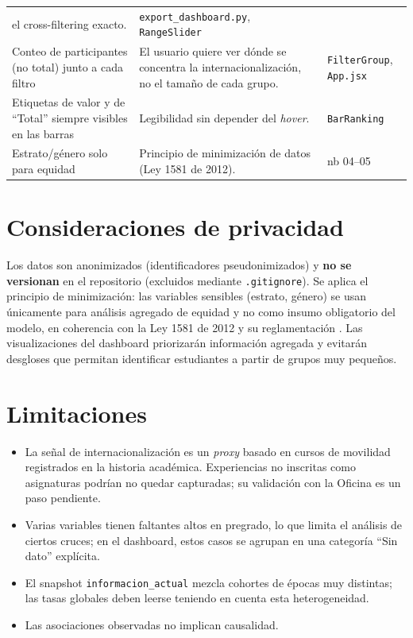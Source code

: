 \documentclass[12pt,a4paper]{article}
\begin{document}
\begin{longtable}{>{\raggedright\arraybackslash}p{4.3cm}
                  >{\raggedright\arraybackslash}p{7.3cm}
                  >{\raggedright\arraybackslash}p{2.8cm}}
el cross-filtering exacto. & \texttt{export\_dashboard.py}, \texttt{RangeSlider} \\
Conteo de participantes (no total) junto a cada filtro &
El usuario quiere ver dónde se concentra la internacionalización, no el tamaño de
cada grupo. & \texttt{FilterGroup}, \texttt{App.jsx} \\
Etiquetas de valor y de ``Total'' siempre visibles en las barras &
Legibilidad sin depender del \emph{hover}. & \texttt{BarRanking} \\
Estrato/género solo para equidad &
Principio de minimización de datos (Ley 1581 de 2012). & nb 04--05 \\
\bottomrule
\end{longtable}

\section{Consideraciones de privacidad}
Los datos son anonimizados (identificadores pseudonimizados) y \textbf{no se
versionan} en el repositorio (excluidos mediante \texttt{.gitignore}). Se aplica
el principio de minimización: las variables sensibles (estrato, género) se usan
únicamente para análisis agregado de equidad y no como insumo obligatorio del
modelo, en coherencia con la Ley 1581 de 2012 y su reglamentación
\cite{ley1581,decreto1377}. Las visualizaciones del dashboard priorizarán
información agregada y evitarán desgloses que permitan identificar estudiantes a
partir de grupos muy pequeños.

\section{Limitaciones}
\begin{itemize}[leftmargin=*]
    \item La señal de internacionalización es un \emph{proxy} basado en cursos de
    movilidad registrados en la historia académica. Experiencias no inscritas como
    asignaturas podrían no quedar capturadas; su validación con la Oficina es un
    paso pendiente.
    \item Varias variables tienen faltantes altos en pregrado, lo que limita el
    análisis de ciertos cruces; en el dashboard, estos casos se agrupan en una
    categoría ``Sin dato'' explícita.
    \item El snapshot \texttt{informacion\_actual} mezcla cohortes de épocas muy
    distintas; las tasas globales deben leerse teniendo en cuenta esta
    heterogeneidad.
    \item Las asociaciones observadas no implican causalidad.
\end{itemize}
\end{document}
